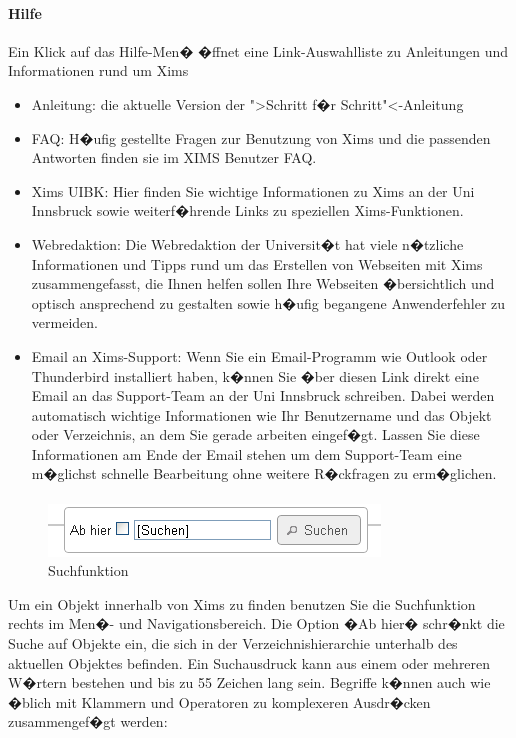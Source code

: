 \paragraph{Hilfe}
Ein Klick auf das Hilfe-Men� �ffnet eine Link-Auswahlliste zu Anleitungen und Informationen rund um Xims
\begin{itemize}
	\item Anleitung: die aktuelle Version der ">Schritt f�r Schritt"<-Anleitung
	\item FAQ: H�ufig gestellte Fragen zur Benutzung von Xims und die passenden Antworten finden sie im XIMS Benutzer FAQ.
	\item Xims UIBK: Hier finden Sie wichtige Informationen zu Xims an der Uni Innsbruck sowie weiterf�hrende Links zu speziellen Xims-Funktionen.
	\item Webredaktion: Die Webredaktion der Universit�t hat viele n�tzliche Informationen und Tipps rund um das Erstellen von Webseiten mit Xims zusammengefasst, die Ihnen helfen sollen Ihre Webseiten �bersichtlich und optisch ansprechend zu gestalten sowie h�ufig begangene Anwenderfehler zu vermeiden.
	\item Email an Xims-Support: Wenn Sie ein Email-Programm wie Outlook oder Thunderbird installiert haben, k�nnen Sie �ber diesen Link direkt eine Email an das Support-Team an der Uni Innsbruck schreiben. Dabei werden automatisch wichtige Informationen wie Ihr Benutzername und das Objekt oder Verzeichnis, an dem Sie gerade arbeiten eingef�gt. Lassen Sie diese Informationen am Ende der Email stehen um dem Support-Team eine m�glichst schnelle Bearbeitung ohne weitere R�ckfragen zu erm�glichen.
\end{itemize}

\paragraph{}
\label{suche}

\begin{figure}[!ht]
  \centering
  \includegraphics[scale=0.7]{./images/suche.png}
  \caption{Suchfunktion}
  \label{fig:suchfunktion}
\end{figure}

Um ein Objekt innerhalb von Xims zu finden benutzen Sie die Suchfunktion rechts im Men�- und Navigationsbereich. Die Option �Ab hier� schr�nkt die Suche auf Objekte ein, die sich in der Verzeichnishierarchie unterhalb des aktuellen Objektes befinden.
Ein Suchausdruck kann aus einem oder mehreren W�rtern bestehen und bis
zu 55 Zeichen lang sein. Begriffe k�nnen auch wie �blich mit Klammern
und Operatoren zu komplexeren Ausdr�cken zusammengef�gt werden:

